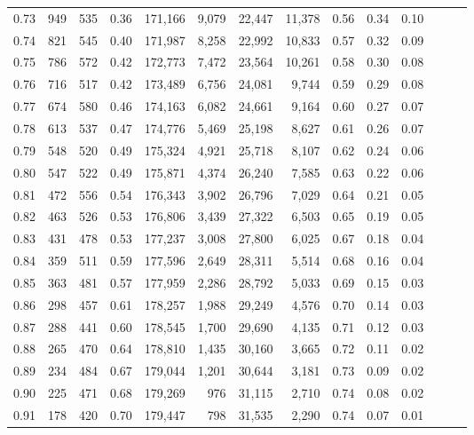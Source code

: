 \begin{tabular}{rrrrrrrrrrrrrr}
0.73 &    949 &  535 &  0.36 &  171,166 &    9,079 &  22,447 &  11,378 &  0.56 &  0.34 &      0.10 \\
0.74 &    821 &  545 &  0.40 &  171,987 &    8,258 &  22,992 &  10,833 &  0.57 &  0.32 &      0.09 \\
0.75 &    786 &  572 &  0.42 &  172,773 &    7,472 &  23,564 &  10,261 &  0.58 &  0.30 &      0.08 \\
0.76 &    716 &  517 &  0.42 &  173,489 &    6,756 &  24,081 &   9,744 &  0.59 &  0.29 &      0.08 \\
0.77 &    674 &  580 &  0.46 &  174,163 &    6,082 &  24,661 &   9,164 &  0.60 &  0.27 &      0.07 \\
0.78 &    613 &  537 &  0.47 &  174,776 &    5,469 &  25,198 &   8,627 &  0.61 &  0.26 &      0.07 \\
0.79 &    548 &  520 &  0.49 &  175,324 &    4,921 &  25,718 &   8,107 &  0.62 &  0.24 &      0.06 \\
0.80 &    547 &  522 &  0.49 &  175,871 &    4,374 &  26,240 &   7,585 &  0.63 &  0.22 &      0.06 \\
0.81 &    472 &  556 &  0.54 &  176,343 &    3,902 &  26,796 &   7,029 &  0.64 &  0.21 &      0.05 \\
0.82 &    463 &  526 &  0.53 &  176,806 &    3,439 &  27,322 &   6,503 &  0.65 &  0.19 &      0.05 \\
0.83 &    431 &  478 &  0.53 &  177,237 &    3,008 &  27,800 &   6,025 &  0.67 &  0.18 &      0.04 \\
0.84 &    359 &  511 &  0.59 &  177,596 &    2,649 &  28,311 &   5,514 &  0.68 &  0.16 &      0.04 \\
0.85 &    363 &  481 &  0.57 &  177,959 &    2,286 &  28,792 &   5,033 &  0.69 &  0.15 &      0.03 \\
0.86 &    298 &  457 &  0.61 &  178,257 &    1,988 &  29,249 &   4,576 &  0.70 &  0.14 &      0.03 \\
0.87 &    288 &  441 &  0.60 &  178,545 &    1,700 &  29,690 &   4,135 &  0.71 &  0.12 &      0.03 \\
0.88 &    265 &  470 &  0.64 &  178,810 &    1,435 &  30,160 &   3,665 &  0.72 &  0.11 &      0.02 \\
0.89 &    234 &  484 &  0.67 &  179,044 &    1,201 &  30,644 &   3,181 &  0.73 &  0.09 &      0.02 \\
0.90 &    225 &  471 &  0.68 &  179,269 &      976 &  31,115 &   2,710 &  0.74 &  0.08 &      0.02 \\
0.91 &    178 &  420 &  0.70 &  179,447 &      798 &  31,535 &   2,290 &  0.74 &  0.07 &      0.01 \\

\end{tabular}
